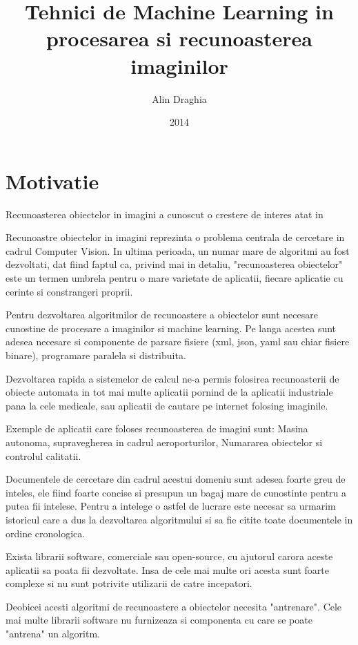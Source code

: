 \documentclass[12pt,a4paper]{article}
\title{Tehnici de Machine Learning in procesarea si recunoasterea imaginilor}
\author{Alin Draghia}
\date{2014}
\begin{document}
\maketitle

\tableofcontents


\pagebreak
\section{Motivatie}


Recunoasterea obiectelor in imagini a cunoscut o crestere de interes atat in 

Recunoastre obiectelor in imagini reprezinta o problema centrala de cercetare in cadrul Computer Vision.
In ultima perioada, un numar mare de algoritmi au fost dezvoltati, dat fiind faptul ca, privind mai in detaliu, 
"recunoasterea obiectelor" este un termen umbrela pentru o mare varietate de aplicatii, fiecare aplicatie
cu cerinte si constrangeri proprii.


Pentru dezvoltarea algoritmilor de recunoastere a obiectelor sunt necesare cunostine de procesare a imaginilor si machine learning.
Pe langa acestea sunt adesea necesare si componente de parsare fisiere (xml, json, yaml sau chiar fisiere binare), programare paralela 
si distribuita.

Dezvoltarea rapida a sistemelor de calcul ne-a permis folosirea recunoasterii de obiecte automata in tot mai multe aplicatii pornind de la aplicatii industriale pana la cele medicale, 
sau aplicatii de cautare pe internet folosing imaginile.


Exemple de aplicatii care foloses recunoasterea de imagini sunt: Masina autonoma, supravegherea in cadrul aeroporturilor, Numararea obiectelor si controlul calitatii.


Documentele de cercetare din cadrul acestui domeniu sunt adesea foarte greu de inteles, ele fiind foarte concise si 
presupun un bagaj mare de cunostinte pentru a putea fii intelese. Pentru a intelege o astfel de lucrare este necesar sa urmarim
istoricul care a dus la dezvoltarea algoritmului si sa fie citite toate documentele in ordine cronologica.


Exista librarii software, comerciale sau open-source, cu ajutorul carora aceste aplicatii sa poata fii dezvoltate. 
Insa de cele mai multe ori acesta sunt foarte complexe si nu sunt potrivite utilizarii de catre incepatori.


Deobicei acesti algoritmi de recunoastere a obiectelor necesita "antrenare". 
Cele mai multe librarii software nu furnizeaza si componenta cu care se poate "antrena" un algoritm.
\end{document}
